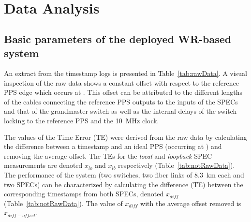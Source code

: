 

\section{Data Analysis}
\label{sec:dataAnalysis}


\subsection{Basic parameters of the deployed WR-based system}

An extract from the timestamp logs is presented in Table~\ref{tab:rawData}. A visual inspection of the raw data 
shows a constant offset with respect to the reference PPS edge which occurs at . 
This offset can be attributed to the different lengths of the cables connecting 
the reference PPS outputs to the inputs of the SPECs and that of the grandmaster switch as well as 
the internal delays of the switch locking to the reference PPS and the 10~MHz clock. 


The values of the Time Error (TE) were derived from the raw data by calculating the difference 
between a timestamp and an ideal PPS (occurring at ) and removing the average offset. 
The TEs for the \textit{local} and \textit{loopback} SPEC measurements are denoted $x_{lo}$ 
and $x_{lb}$ respectively (Table~\ref{tab:notRawData}). The performance of the system 
(two switches, two fiber links of 8.3~km each and two SPECs) can be characterized by calculating the 
difference (TE) between the corresponding timestamps from both SPECs, denoted $x_{diff}$ 
(Table~\ref{tab:notRawData}). The value of $x_{diff}$ with the average offset removed is  
$x_{diff-offset}$. 



